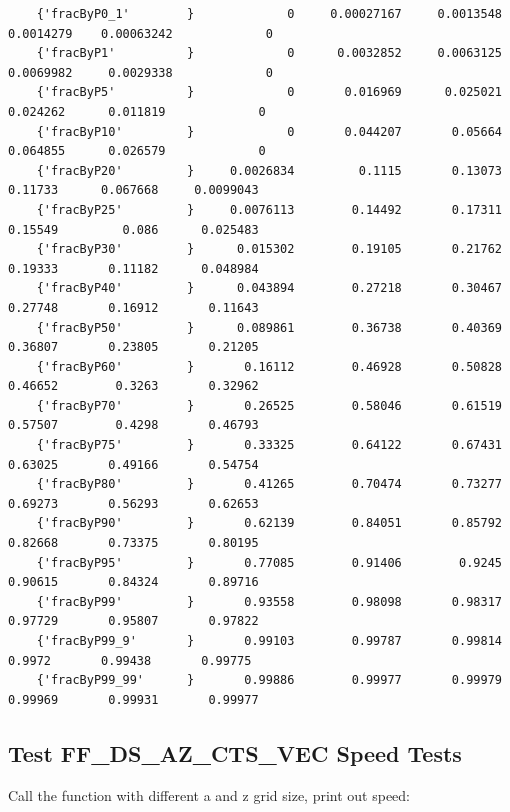 \documentclass[
]{book}
\begin{document}
\begin{verbatim}
    {'fracByP0_1'        }             0     0.00027167     0.0013548     0.0014279    0.00063242             0 
    {'fracByP1'          }             0      0.0032852     0.0063125     0.0069982     0.0029338             0 
    {'fracByP5'          }             0       0.016969      0.025021      0.024262      0.011819             0 
    {'fracByP10'         }             0       0.044207       0.05664      0.064855      0.026579             0 
    {'fracByP20'         }     0.0026834         0.1115       0.13073       0.11733      0.067668     0.0099043 
    {'fracByP25'         }     0.0076113        0.14492       0.17311       0.15549         0.086      0.025483 
    {'fracByP30'         }      0.015302        0.19105       0.21762       0.19333       0.11182      0.048984 
    {'fracByP40'         }      0.043894        0.27218       0.30467       0.27748       0.16912       0.11643 
    {'fracByP50'         }      0.089861        0.36738       0.40369       0.36807       0.23805       0.21205 
    {'fracByP60'         }       0.16112        0.46928       0.50828       0.46652        0.3263       0.32962 
    {'fracByP70'         }       0.26525        0.58046       0.61519       0.57507        0.4298       0.46793 
    {'fracByP75'         }       0.33325        0.64122       0.67431       0.63025       0.49166       0.54754 
    {'fracByP80'         }       0.41265        0.70474       0.73277       0.69273       0.56293       0.62653 
    {'fracByP90'         }       0.62139        0.84051       0.85792       0.82668       0.73375       0.80195 
    {'fracByP95'         }       0.77085        0.91406        0.9245       0.90615       0.84324       0.89716 
    {'fracByP99'         }       0.93558        0.98098       0.98317       0.97729       0.95807       0.97822 
    {'fracByP99_9'       }       0.99103        0.99787       0.99814        0.9972       0.99438       0.99775 
    {'fracByP99_99'      }       0.99886        0.99977       0.99979       0.99969       0.99931       0.99977 
\end{verbatim}

\hypertarget{test-ff_ds_az_cts_vec-speed-tests}{%
\subsection{Test FF\_DS\_AZ\_CTS\_VEC Speed Tests}\label{test-ff_ds_az_cts_vec-speed-tests}}

Call the function with different a and z grid size, print out speed:
\end{document}
